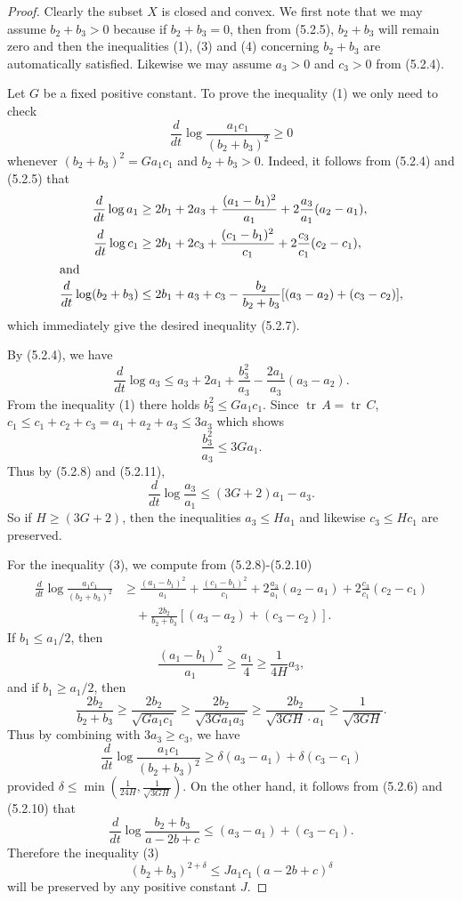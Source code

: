 \begin{proof}
Clearly the subset $X$ is closed and convex.  We first note that
we may assume $b_2+b_3>0$ because if $b_2+b_3=0$, then from
(5.2.5), $b_2+b_3$ will remain zero and then the inequalities (1),
(3) and (4) concerning $b_2+b_3$ are automatically satisfied.
Likewise we may assume $a_3>0$ and $c_3>0$ from (5.2.4).

Let $G$ be a fixed positive constant. To prove the inequality (1)
we only need to check \begin{equation}
\frac{d}{dt}\log\frac{a_1c_1}{(b_2+b_3)^2}\geq 0 %
\end{equation} whenever $(b_2+b_3)^2=Ga_1c_1$ and $b_2+b_3>0$. Indeed, it
follows from (5.2.4) and (5.2.5) that
\begin{align}
\frac{d}{dt}\log a_1 &\geq
2b_1+2a_3+\frac{(a_1-b_1)^2}{a_1}+2\frac{a_3}{a_1}(a_2-a_1), \\
\frac{d}{dt}\log c_1 &\geq
2b_1+2c_3+\frac{(c_1-b_1)^2}{c_1}+2\frac{c_3}{c_1}(c_2-c_1), \\
\intertext{and} \frac{d}{dt}\log(b_2+b_3)&\leq
2b_1+a_3+c_3-\frac{b_2}{b_2+b_3}[(a_3-a_2)+(c_3-c_2)],
\end{align}
which immediately give the desired inequality (5.2.7).

By (5.2.4), we have \begin{equation} \frac{d}{dt}\log a_3\leq
a_3+2a_1+\frac{b_3^2}{a_3}-\frac{2a_1}{a_3}(a_3-a_2).
\end{equation} {}From the inequality (1) there holds $b_3^2\leq Ga_1c_1$.
Since $\operatorname{tr}\, A=\operatorname{tr}\, C$, $c_1\leq c_1+c_2+c_3=a_1+a_2+a_3\leq 3a_3$
\noindent which shows
$$
\frac{b_3^2}{a_3}\leq 3Ga_1.
$$
Thus by (5.2.8) and (5.2.11),
$$
\frac{d}{dt}\log\frac{a_3}{a_1}\leq (3G+2)a_1-a_3.
$$
So if $H\geq (3G+2)$, then the inequalities $a_3\leq Ha_1$ and
likewise $c_3\leq Hc_1$ are preserved.

For the inequality (3), we compute from (5.2.8)-(5.2.10)
\begin{align*}
\frac{d}{dt}\log\frac{a_1c_1}{(b_2+b_3)^2}&  \geq
\frac{(a_1-b_1)^2}{a_1}+\frac{(c_1-b_1)^2}{c_1}
+2\frac{a_3}{a_1}(a_2-a_1)+2\frac{c_3}{c_1}(c_2-c_1)\\
&\quad +\frac{2b_2}{b_2+b_3}[(a_3-a_2)+(c_3-c_2)].
\end{align*}
If $b_1\leq a_1/2$, then
$$
\frac{(a_1-b_1)^2}{a_1}\geq \frac{a_1}{4}\geq\frac{1}{4H}a_3,
$$
and if $b_1\geq a_1/2$, then
$$
\frac{2b_2}{b_2+b_3}\geq \frac{2b_2}{\sqrt{Ga_1c_1}}\geq
\frac{2b_2}{\sqrt{3Ga_1a_3}}\geq \frac{2b_2}{\sqrt{3GH}\cdot a_1}
\geq \frac{1}{\sqrt{3GH}}.
$$
Thus by combining with $ 3a_3 \geq c_3$, we have
$$
\frac{d}{dt}\log\frac{a_1c_1}{(b_2+b_3)^2}\geq \delta
(a_3-a_1)+\delta(c_3-c_1)
$$
provided $\delta\leq \min(\frac{1}{24H},\frac{1}{\sqrt{3GH}})$. On
the other hand, it follows from (5.2.6) and (5.2.10) that
$$
\frac{d}{dt}\log\frac{b_2+b_3}{a-2b+c}\leq(a_3-a_1)+(c_3-c_1).
$$
Therefore the inequality (3)
$$
(b_2+b_3)^{2+\delta}\le Ja_1c_1(a-2b+c)^\delta
$$
will be preserved by any positive constant $J$.


\end{proof}
